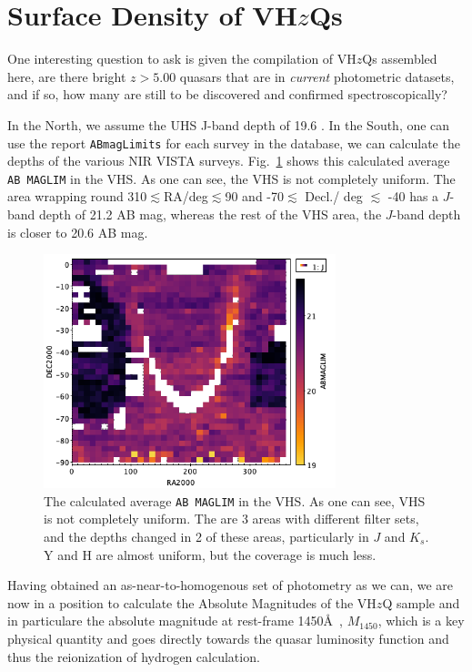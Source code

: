\section{Surface Density of VH$z$Qs}
One interesting question to ask is given the compilation of VH$z$Qs
assembled here, are there bright $z>5.00$ quasars that are in {\it
current} photometric datasets, and if so, how many are still to be
discovered and confirmed spectroscopically?

In the North, we assume the UHS J-band depth of 19.6 \citep[Vega;
][]{Dye2018}.  In the South, one can use the report {\tt ABmagLimits}
for each survey in the database, we can calculate the depths of the
various NIR VISTA surveys.  Fig.~\ref{fig:VHS_J_abMagLim} shows this
calculated average {\tt AB MAGLIM} in the VHS.  As one can see, the
VHS is not completely uniform. The area wrapping round
310$\lesssim$RA/deg$\lesssim$90 and -70$\lesssim$ Decl./ deg
$\lesssim$ -40 has a $J$-band depth of 21.2 AB mag, whereas the rest
of the VHS area, the $J$-band depth is closer to 20.6 AB mag.

\begin{figure}
  \centering
  \includegraphics[width=8.5cm]{../data/WSA_VSA/VHS_J_abMagLim.png}
  \caption{The calculated average {\tt AB MAGLIM} in the VHS.
    As one can see, VHS is not completely uniform. The are 3 areas with different filter sets, 
    and the depths changed in 2 of these areas, particularly in $J$ and $K_{s}$. 
    Y and H are almost uniform, but the coverage is much less.}
  \label{fig:VHS_J_abMagLim}
\end{figure}

Having obtained an as-near-to-homogenous set of photometry as we can, 
we are now in a position to calculate the Absolute Magnitudes of the VH$z$Q 
sample and in particulare the absolute magnitude at rest-frame 1450\AA\ , $M_{1450}$, 
which is a key physical quantity and goes directly towards the quasar luminosity 
function and thus the reionization of hydrogen calculation. 

